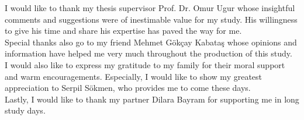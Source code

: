 I would like to thank my thesis supervisor Prof. Dr. Omur Ugur whose insightful comments and suggestions were of inestimable value for my study. His willingness to give his time and share his expertise has paved the way for me. \\

Special thanks also go to my friend Mehmet Gökçay Kabataş whose opinions and information have helped me very much throughout the production of this study. \\

I would also like to express my gratitude to my family for their moral support and warm encouragements. Especially, I would like to show my greatest appreciation to Serpil Sökmen, who provides me to come these days. \\

Lastly, I would like to thank my partner Dilara Bayram for supporting me in long study days. \\
